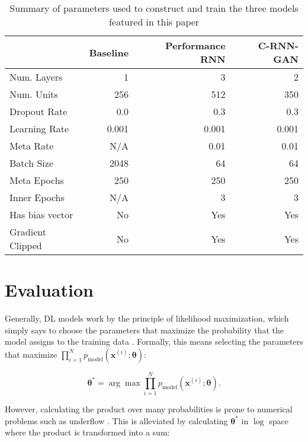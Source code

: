 \documentclass[a4paper]{book}
\begin{document}
\begin{table}[hb]
    \centering
    \begin{tabular}{l|r|r|r}
                    &\bf Baseline   &\bf Performance RNN&\bf C-RNN-GAN  \\ \hline
    Num. Layers     &   1           &   3               &   2           \\
    Num. Units      &   256         &   512             &   350         \\
    Dropout Rate    &   0.0         &   0.3             &   0.3         \\
    Learning Rate   &   0.001       &   0.001           &   0.001       \\
    Meta Rate       &   N/A         &   0.01            &   0.01        \\
    Batch Size      &   2048        &   64              &   64          \\
    Meta Epochs     &   250         &   250             &   250         \\
    Inner Epochs    &   N/A         &   3               &   3           \\
    Has bias vector &   No          &   Yes             &   Yes         \\
    Gradient Clipped&   No          &   Yes             &   Yes         \\
    \end{tabular}
    \caption{Summary of parameters used to construct and train the three models featured in this paper}
    \label{tab:params}
\end{table}

\section{Evaluation} \label{sec:evaluation}

Generally, DL models work by the principle of likelihood maximization, which simply says to choose the parameters that maximize the probability that the model assigns to the training data \parencite{goodfellow_nips_2016}. Formally, this means selecting the parameters that maximize $\prod_{i=1}^N p_{\text{model}}(\bm{x}^{(i)}; \bm{\theta})$:

\begin{equation}
    \bm{\theta^*} = \arg \max \prod_{i=1}^N p_{\text{model}}(\bm{x}^{(i)}; \bm{\theta}) \label{eq:og_mle}.
\end{equation}

However, calculating the product over many probabilities is prone to numerical problems such as underflow \parencite{goodfellow_nips_2016}. This is alleviated by calculating $\bm{\theta^*}$ in $\log$ space where the product is transformed into a sum:
\end{document}
